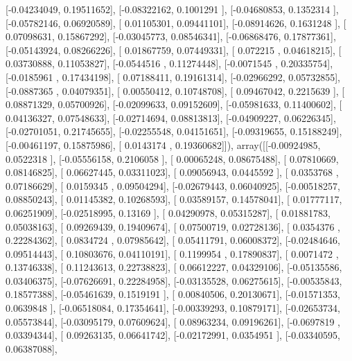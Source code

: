\documentclass{article}
\begin{document}
       [-0.04234049,  0.19511652],
       [-0.08322162,  0.1001291 ],
       [-0.04680853,  0.1352314 ],
       [-0.05782146,  0.06920589],
       [ 0.01105301,  0.09441101],
       [-0.08914626,  0.1631248 ],
       [ 0.07098631,  0.15867292],
       [-0.03045773,  0.08546341],
       [-0.06868476,  0.17877361],
       [-0.05143924,  0.08266226],
       [ 0.01867759,  0.07449331],
       [ 0.072215  ,  0.04618215],
       [ 0.03730888,  0.11053827],
       [-0.0544516 ,  0.11274448],
       [-0.0071545 ,  0.20335754],
       [-0.0185961 ,  0.17434198],
       [ 0.07188411,  0.19161314],
       [-0.02966292,  0.05732855],
       [-0.0887365 ,  0.04079351],
       [ 0.00550412,  0.10748708],
       [ 0.09467042,  0.2215639 ],
       [ 0.08871329,  0.05700926],
       [-0.02099633,  0.09152609],
       [-0.05981633,  0.11400602],
       [ 0.04136327,  0.07548633],
       [-0.02714694,  0.08813813],
       [-0.04909227,  0.06226345],
       [-0.02701051,  0.21745655],
       [-0.02255548,  0.04151651],
       [-0.09319655,  0.15188249],
       [-0.00461197,  0.15875986],
       [ 0.0143174 ,  0.19360682]]), array([[-0.00924985,  0.0522318 ],
       [-0.05556158,  0.2106058 ],
       [ 0.00065248,  0.08675488],
       [ 0.07810669,  0.08146825],
       [ 0.06627445,  0.03311023],
       [ 0.09056943,  0.0445592 ],
       [ 0.0353768 ,  0.07186629],
       [ 0.0159345 ,  0.09504294],
       [-0.02679443,  0.06040925],
       [-0.00518257,  0.08850243],
       [ 0.01145382,  0.10268593],
       [ 0.03589157,  0.14578041],
       [ 0.01777117,  0.06251909],
       [-0.02518995,  0.13169   ],
       [ 0.04290978,  0.05315287],
       [ 0.01881783,  0.05038163],
       [ 0.09269439,  0.19409674],
       [ 0.07500719,  0.02728136],
       [ 0.0354376 ,  0.22284362],
       [ 0.0834724 ,  0.07985642],
       [ 0.05411791,  0.06008372],
       [-0.02484646,  0.09514443],
       [ 0.10803676,  0.04110191],
       [ 0.1199954 ,  0.17890837],
       [ 0.0071472 ,  0.13746338],
       [ 0.11243613,  0.22738823],
       [ 0.06612227,  0.04329106],
       [-0.05135586,  0.03406375],
       [-0.07626691,  0.22284958],
       [-0.03135528,  0.06275615],
       [-0.00535843,  0.18577388],
       [-0.05461639,  0.1519191 ],
       [ 0.00840506,  0.20130671],
       [-0.01571353,  0.0639848 ],
       [-0.06518084,  0.17354641],
       [-0.00339293,  0.10879171],
       [-0.02653734,  0.05573844],
       [-0.03095179,  0.07609624],
       [ 0.08963234,  0.09196261],
       [-0.0697819 ,  0.03394344],
       [ 0.09263135,  0.06641742],
       [-0.02172991,  0.0354951 ],
       [-0.03340595,  0.06387088],
\end{document}
